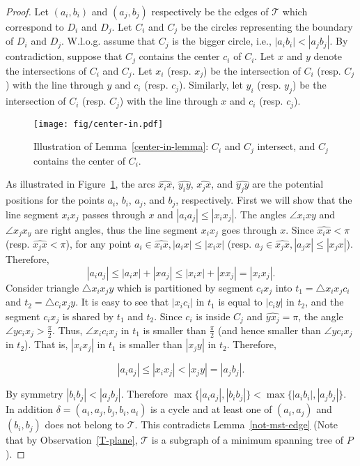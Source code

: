 \documentclass[11pt,a4paper]{article}
\begin{document}
\begin{proof}
 Let $(a_i,b_i)$ and $(a_j,b_j)$ respectively be the edges of $\mathcal{T}$ which correspond to $D_i$ and $D_j$. Let $C_i$ and $C_j$ be the circles representing the boundary of $D_i$ and $D_j$. W.l.o.g. assume that $C_j$ is the bigger circle, i.e., $|a_ib_i|<|a_jb_j|$. By contradiction, suppose that $C_j$ contains the center $c_i$ of $C_i$. Let $x$ and $y$ denote the intersections of $C_i$ and $C_j$. Let $x_i$ (resp. $x_j$) be the intersection of $C_i$ (resp. $C_j$) with the line through $y$ and $c_i$ (resp. $c_j$). Similarly, let $y_i$ (resp. $y_j$) be the intersection of $C_i$ (resp. $C_j$) with the line through $x$ and $c_i$ (resp. $c_j$). 

\begin{figure}[htb]
  \centering
  \texttt{[image: fig/center-in.pdf]}
 \caption{Illustration of Lemma~\ref{center-in-lemma}: $C_i$ and $C_j$ intersect, and $C_j$ contains the center of $C_i$.}
  \label{center-in-fig}
\end{figure}

As illustrated in Figure~\ref{center-in-fig}, the arcs $\widehat{x_ix}$, $\widehat{y_iy}$, $\widehat{x_jx}$, and $\widehat{y_jy}$ are the potential positions for the points $a_i$, $b_i$, $a_j$, and $b_j$, respectively. First we will show that the line segment $x_ix_j$ passes through $x$ and $|a_ia_j|\leq|x_ix_j|$. The angles $\angle x_ixy$ and $\angle x_jx_y$ are right angles, thus the line segment $x_ix_j$ goes through $x$. Since $\widehat{x_ix}<\pi$ (resp. $\widehat{x_jx}<\pi$), for any point $a_i\in \widehat{x_ix}, |a_ix|\leq|x_ix|$ (resp. $a_j\in \widehat{x_jx}, |a_jx|\leq|x_jx|$). Therefore, $$|a_ia_j|\leq|a_ix|+|xa_j|\leq|x_ix|+|xx_j|=|x_ix_j|.$$
Consider triangle $\bigtriangleup x_ix_jy$ which is partitioned by segment $c_ix_j$ into $t_1=\bigtriangleup x_ix_jc_i$ and $t_2=\bigtriangleup c_ix_jy$. It is easy to see that $|x_ic_i|$ in $t_1$ is equal to $|c_iy|$ in $t_2$, and the segment $c_ix_j$ is shared by $t_1$ and $t_2$. Since $c_i$ is inside $C_j$ and $\widehat{yx_j}=\pi$, the angle $\angle yc_ix_j>\frac{\pi}{2}$. Thus, $\angle x_ic_ix_j$ in $t_1$ is smaller than $\frac{\pi}{2}$ (and hence smaller than $\angle yc_ix_j$ in $t_2$). That is,  $|x_ix_j|$ in $t_1$ is smaller than $|x_jy|$ in $t_2$. Therefore,

$$|a_ia_j|\leq|x_ix_j|<|x_jy|=|a_jb_j|.$$

By symmetry $|b_ib_j|<|a_jb_j|$. Therefore $\max\{|a_ia_j|,|b_ib_j|\}<\max\{|a_ib_i|,|a_jb_j|\}$. In addition $\delta=(a_i,a_j,b_j,b_i,a_i)$ is a cycle and at least one of $(a_i,a_j)$ and $(b_i,b_j)$ does not belong to $\mathcal{T}$. This contradicts Lemma~\ref{not-mst-edge} (Note that by Observation~\ref{T-plane}, $\mathcal{T}$ is a subgraph of a minimum spanning tree of $P$).
\end{proof}
\end{document}
